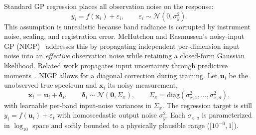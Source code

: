 \documentclass[11pt]{article}
\newcommand{\Sigx}{\Sigma_{x}}
\newcommand{\noisey}{\sigma_y^{2}}
\begin{document}
Standard GP regression places all observation noise on the response:
\begin{equation}
\label{eq:std-obs}
  y_i = f(\mathbf{x}_i)+\varepsilon_i,
  \qquad
  \varepsilon_i\sim\mathcal{N}(0,\noisey).
\end{equation}
This assumption is unrealistic because band radiance is corrupted by
instrument noise, scaling, and registration error. McHutchon and Rasmussen's noisy-input GP (NIGP)~\cite{mchutchon2011nigp} addresses this
by propagating independent per-dimension input noise into an \emph{effective}
observation noise while retaining a closed-form Gaussian likelihood.
Related work propagates input uncertainty through predictive
moments~\cite{girard2003uncertain,quinonero2003propagation,dallaire2009uncertain}.
NIGP allows for a diagonal correction during training. Let $\mathbf{u}_i$ be the unobserved true spectrum and $\mathbf{x}_i$ its noisy measurement,
\begin{equation}
\label{eq:nigp-inputs}
  \mathbf{x}_i = \mathbf{u}_i + \boldsymbol{\delta}_i,
  \qquad
  \boldsymbol{\delta}_i\sim\mathcal{N}(\mathbf{0},\Sigx),
  \qquad
  \Sigx=\mathrm{diag}(\sigma_{x,1}^{2},\ldots,\sigma_{x,d}^{2}),
\end{equation}
with learnable per-band input-noise variances in $\Sigx$.
The regression target is still $y_i=f(\mathbf{u}_i)+\varepsilon_i$ with
homoscedastic output noise $\noisey$.
Each $\sigma_{x,a}$ is parameterized in $\log_{10}$ space and softly bounded to a
physically plausible range ($\bigl[ 10^{-6}, 1\bigr]$).
\end{document}
